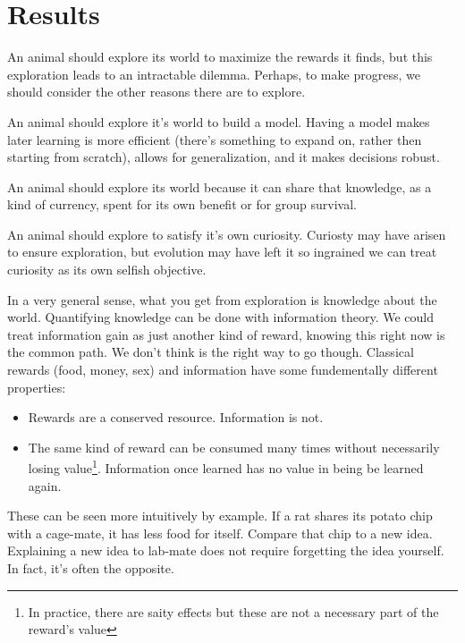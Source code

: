 \documentclass[9pt,twocolumn,twoside]{pnas-new}
\begin{document}
\section*{Results}
An animal should explore its world to maximize the rewards it finds, but this exploration leads to an intractable dilemma. Perhaps, to make progress, we should consider the other reasons there are to explore.

An animal should explore it's world to build a model. Having a model makes later learning is more efficient (there's something to expand on, rather then starting from scratch), allows for generalization, and it makes decisions robust. 
 
An animal should explore its world because it can share that knowledge, as a kind of currency, spent for its own benefit or for group survival.  

An animal should explore to satisfy it's own curiosity. Curiosty may have arisen to ensure exploration, but evolution may have left it so ingrained we can treat curiosity as its own selfish objective.

In a very general sense, what you get from exploration is knowledge about the world. Quantifying knowledge can be done with information theory. We could treat information gain as just another kind of reward, knowing this right now is the common path. We don't think is the right way to go though. Classical rewards (food, money, sex) and information have some fundementally different properties:

\begin{itemize}
    \item Rewards are a conserved resource. Information is not. 
    \item The same kind of reward can be consumed many times without necessarily losing value\footnote{In practice, there are saity effects but these are not a necessary part of the reward's value}. Information once learned has no value in being be learned again.
\end{itemize}

These can be seen more intuitively by example. If a rat shares its potato chip with a cage-mate, it has less food for itself. Compare that chip to a new idea. Explaining a new idea to lab-mate does not require forgetting the idea yourself. In fact, it's often the opposite.
\end{document}
